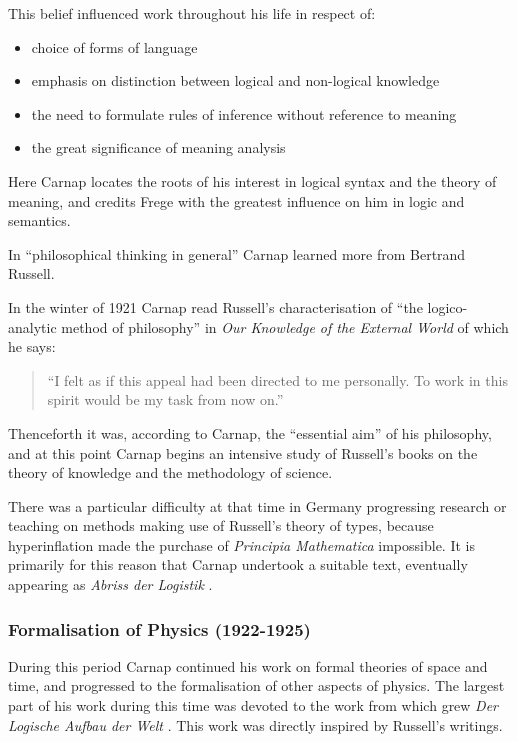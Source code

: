 \documentclass[10pt,titlepage]{book}
\begin{document}
This belief influenced work throughout his life in respect of:
\begin{itemize}
\item choice of forms of language
\item emphasis on distinction between logical and non-logical knowledge
\item the need to formulate rules of inference without reference to meaning
\item the great significance of meaning analysis
\end{itemize}

Here Carnap locates the roots of his interest in logical syntax and the theory of meaning, and credits Frege with the greatest influence on him in logic and semantics.

In ``philosophical thinking in general'' Carnap learned more from Bertrand Russell.

In the winter of 1921 Carnap read Russell's characterisation of ``the logico-analytic method of philosophy'' in \emph{Our Knowledge of the External World} \cite{russell1921} of which he says:
\begin{quote}
``I felt as if this appeal had been directed to me personally.
To work in this spirit would be my task from now on.''
\end{quote}
Thenceforth it was, according to Carnap, the ``essential aim'' of his philosophy, and at this point Carnap begins an intensive study of Russell's books on the theory of knowledge and the methodology of science.

There was a particular difficulty at that time in Germany progressing research or teaching on methods making use of Russell's theory of types, because hyperinflation made the purchase of \emph{Principia Mathematica} impossible.
It is primarily for this reason that Carnap undertook a suitable text, eventually appearing as \emph{Abriss der Logistik} \cite{carnap29}.

\subsubsection{Formalisation of Physics (1922-1925)}

During this period Carnap continued his work on formal theories of space and time, and progressed to the formalisation of other aspects of physics.
The largest part of his work during this time was devoted to the work from which grew \emph{Der Logische Aufbau der Welt} \cite{carnap28}.
This work was directly inspired by Russell's writings.
\end{document}
